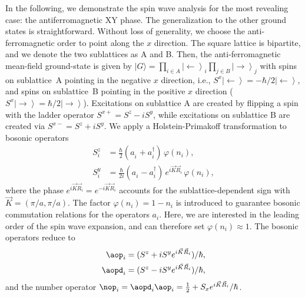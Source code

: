 In the following, we demonstrate the spin wave analysis for the most revealing case: the antiferromagnetic XY phase.
The generalization to the other ground states is straightforward.  Without loss of generality, we choose the anti-ferromagnetic order
to point along the  $x$ direction. The square lattice is bipartite, and we denote the two sublattices as A and B. Then, the anti-ferromagnetic
 mean-field ground-state is given by   $|G\rangle = \prod_{i\in A} \left|\leftarrow\right\rangle_{i} \prod_{j\in B} \left|\rightarrow\right\rangle_{j}$
 with spins on sublattice~A pointing in the negative $x$ direction, i.e., $S^x \left|\leftarrow\right\rangle = -\hbar/2 \left|\leftarrow\right\rangle$,
 and spins on sublattice~B pointing in the positive $x$ direction ($S^x \left|\rightarrow\right\rangle = \hbar/2 \left|\rightarrow\right\rangle$).
 Excitations on sublattice A are created by flipping a spin with the ladder operator $S^{x+} = S^z-i S^y$,
 while excitations on sublattice B are created via $S^{x-} = S^z+i S^y$.
 We apply a Holstein-Primakoff transformation to bosonic operators
\begin{align} \label{transHolstein}
    S^z_i &= \frac{\hbar}{2} (a^{\phantom\dag}_i + a^{\dag}_i) \,\varphi(n_i),\\
    S^y_i &= \frac{\hbar}{2i} (a^{\phantom\dag}_i - a^{\dag}_i)\, e^{i {\vec K} {\vec R_i}} \,\varphi(n_i),
\end{align}
where the phase $e^{i {\vec K}{\vec R_i}}=e^{-i {\vec K}{\vec R_i}}$ accounts for the sublattice-dependent sign with ${\vec K} = (\pi/a, \pi/a)$. The factor $\varphi(n_i)=1-n_i$ is introduced to guarantee bosonic commutation relations for the operators $a_i$.  Here, we are interested in the leading order of the spin wave expansion, and can therefore set
 $\varphi(n_i) \approx 1$. The bosonic operators reduce to
%
\begin{align}
    \aop_i &= (S^z +i S^y e^{i {\vec K} {\vec R_i}} )/\hbar,\\
    \aopd_i &= (S^z -i S^y e^{i {\vec K} {\vec R_i}})/\hbar,
\end{align}
%
and the number operator $\nop_i = \aopd_i \aop_i = \frac{1}{2} + S_x e^{i {\vec K}{\vec R_i}}/\hbar$.


